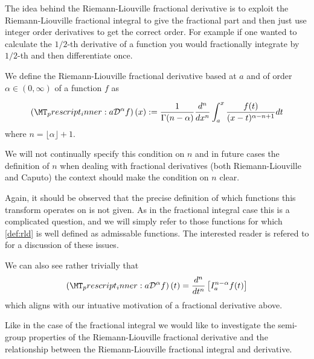 The idea behind the Riemann-Liouville fractional derivative is to exploit the Riemann-Liouville fractional integral to give the fractional part and then just use integer order derivatives to get the correct order. For example if one wanted to calculate the $ 1/2$-th derivative of a function you would fractionally integrate by $1/2$-th and then differentiate once.
\begin{definition}
We define the Riemann-Liouville fractional derivative based at $ a $ and of order $ \alpha \in (0, \infty) $ of a function $ f $ as

\begin{align}
    \label{def:rld}
    \rld{a}{}{\alpha}{f}(x) := \frac{1}{\Gamma(n-\alpha)} \frac{d^n}{dx^n} \int_{a}^{x} \frac{f(t)}{(x-t)^{\alpha - n + 1}} dt
\end{align}
where $ n = \lfloor \alpha \rfloor + 1 $.
\end{definition}
We will not continually specify this condition on $ n $ and in future cases the definition of $ n $ when dealing with fractional derivatives (both Riemann-Liouville and Caputo) the context should make the condition on $ n $ clear.


Again, it should be observed that the precise definition of which functions this transform operates on is not given. As in the fractional integral case this is a complicated question, and we will simply refer to those functions for which \eqref{def:rld} is well defined as admissable functions. The interested reader is refered to \cite{Samko1993} for a discussion of these issues.

We can also see rather trivially that
\begin{align}
    \label{eq:rld_rli_rel}
    \left(\prescript{}{a}{\mathcal{D}}^\alpha{f}\right)(t) = \frac{d^n}{dt^n}\left[ I_a^{n-\alpha}f(t) \right]
\end{align}
which aligns with our intuative motivation of a fractional derivative above.

Like in the case of the fractional integral we would like to investigate the semi-group properties of the Riemann-Liouville fractional derivative and the relationship between the Riemann-Liouville fractional integral and derivative.

